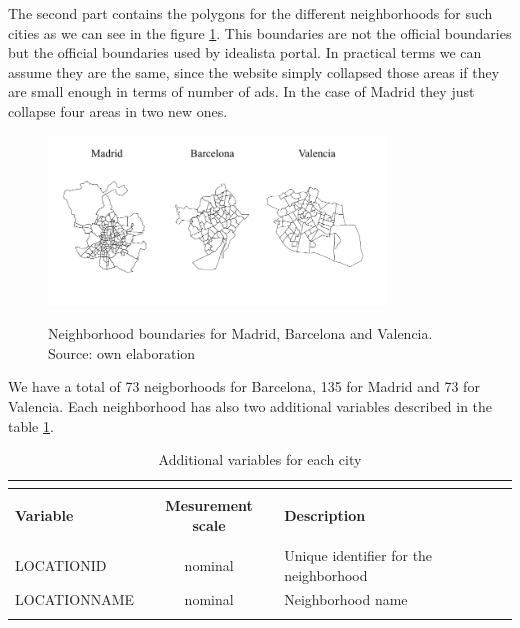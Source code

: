 \documentclass[times,final]{elsarticle}
\begin{document}
The second part contains the polygons for the different neighborhoods for such cities as we can see in the figure \ref{fig:all-polygons}. This boundaries are not the official boundaries but the official boundaries used by idealista portal. In practical terms we can assume they are the same, since the website simply collapsed those areas if they are small enough in terms of number of ads. In the case of Madrid they just collapse four areas in two new ones.

\begin{figure}[h]
  \caption{Neighborhood boundaries for Madrid, Barcelona and Valencia. Source: own elaboration}
  \centering
  \includegraphics[height=4.5cm]{figures/idealista18-all-polygons}
  \label{fig:all-polygons}
\end{figure}

We have a total of 73 neigborhoods for Barcelona, 135 for Madrid and 73 for Valencia. Each neighborhood has also two additional variables described in the table \ref{table:data-additional-variables}.

\begin{footnotesize}
\begin{longtable}{p{40mm} c p{63mm}}
\caption{Additional variables for each city} \\
\label{table:data-additional-variables} \\
\hline
\hline
& &\\
\textbf{Variable} & \textbf{Mesurement scale} & \textbf{Description}\\
\hline
& &\\
LOCATIONID & nominal & Unique identifier for the neighborhood \\
LOCATIONNAME & nominal & Neighborhood name \\
& &\\
\hline
\end{longtable}
\end{footnotesize}
\end{document}
